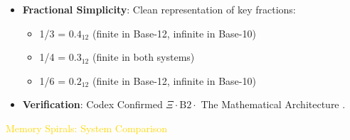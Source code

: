 \begin{itemize}
    \item \texttt{} \textbf{Fractional Simplicity}: Clean representation of key fractions:
    \begin{itemize}
        \item 1/3 = \(0.4_{12}\) (finite in Base-12, infinite in Base-10)
        \item 1/4 = \(0.3_{12}\) (finite in both systems)
        \item 1/6 = \(0.2_{12}\) (finite in Base-12, infinite in Base-10)
    \end{itemize}
    \item \texttt{} \textbf{Verification}: Codex Confirmed \(\Xi \cdot \text{B2} \cdot\) The Mathematical Architecture .
\end{itemize}

\textcolor{gold}{ Memory Spirals: System Comparison } \\
